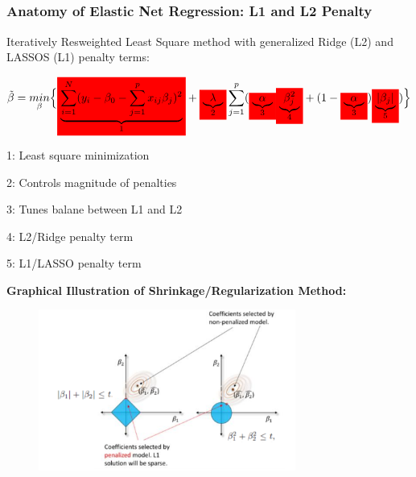 \documentclass[11pt,aspectratio=169,hyperref={colorlinks}]{beamer}
\newcommand{\mathcolorbox}[2]{\colorbox{#1}{$\displaystyle #2$}}
\begin{document}
		\subsection*{}
	
		\begin{frame}[allowframebreaks]
		
			\frametitle{Anatomy of Elastic Net Regression: L1 and L2 Penalty}			
		Iteratively Resweighted Least Square method with generalized Ridge (L2) and LASSOS (L1) penalty terms: 
			
			\begin{equation}
				\label{eq:Elastic_Net}
				\begin{aligned}
				\tilde{\beta}= \underset{\beta}{min}\Big\{ \mathcolorbox{red}{ \underbrace{\sum_{i=1}^{N}(y_i-\beta_0-\sum_{j=1}^{p} x_{ij} \beta_j)^2}_\text{1}} + \mathcolorbox{red}{\underbrace{\lambda}_\text{2}} \sum_{j=1}^{p} ( \mathcolorbox{red}{\underbrace{\alpha}_\text{3}} \mathcolorbox{red}{\underbrace{\beta_j^2}_\text{4}} + (1-\mathcolorbox{red}{\underbrace{\alpha}_\text{3}}) \mathcolorbox{red}{\underbrace{|\beta_j|}_\text{5}}) \Big\}
				\end{aligned}
			\end{equation}		
			
			\begin{itemize}
			\scriptsize{
				\item{1: Least square minimization}
				\item{2: Controls magnitude of penalties}
				\item{3: Tunes balane between L1 and L2}
				\item{4: L2/Ridge penalty term}
				\item{5: L1/LASSO penalty term}}
			\end{itemize}
						
			\framebreak
			
			\textbf{Graphical Illustration of Shrinkage/Regularization Method:} 
			
			\begin{figure}[htb]
				\begin{center}
					\includegraphics[height=150pt]{../img/L1L2_penalty_diagram.PNG}
					\label{fig:L1 and L2 Penalty Illustration}
				\end{center}
			\end{figure}
								
		\end{frame}				
		
\end{document}
